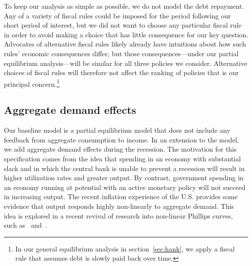 \documentclass[qe]{econsocart}
\begin{document}
To keep our analysis as simple as possible, we do not model the debt repayment.
Any of a variety of fiscal rules could be imposed for the period following our short period of interest, but we did not want to choose any particular fiscal rule in order to avoid making a choice that has little consequence for our key question.
Advocates of alternative fiscal rules likely already have intuitions about how such rules' economic consequences differ, but those consequences---under our partial equilibrium analysis---will be similar for all three policies we consider.
Alternative choices of fiscal rules will therefore not affect the ranking of policies that is our principal concern.\footnote{In our general equilibrium analysis in section~\ref{sec:hank}, we apply a fiscal rule that assumes debt is slowly paid back over time.}

\subsection{Aggregate demand effects}\label{aggregate-demand-effects}
\label{sec:ADeffects} 

Our baseline model is a partial equilibrium model that does not include any feedback from aggregate consumption to income.
In an extension to the model, we add aggregate demand effects during the recession.
The motivation for this specification comes from the idea that spending in an economy with substantial slack and in which the central bank is unable to prevent a recession will result in higher utilization rates and greater output.
By contrast, government spending in an economy running at potential with an active monetary policy will not succeed in increasing output.
The recent inflation experience of the U.S.
provides some evidence that output responds highly non-linearly to aggregate demand.
This idea is explored in a recent revival of research into non-linear Phillips curves, such as~\cite{benigno2023baaack} and~\cite{blanco2024nonlinear}.
\end{document}
